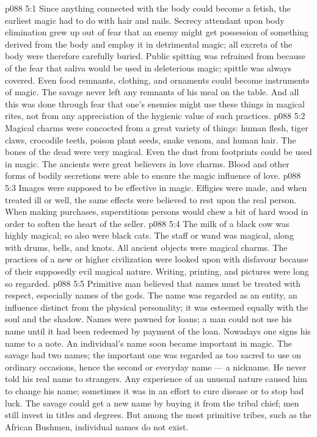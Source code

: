 \vs p088 5:1 Since anything connected with the body could become a fetish, the earliest magic had to do with hair and nails. Secrecy attendant upon body elimination grew up out of fear that an enemy might get possession of something derived from the body and employ it in detrimental magic; all excreta of the body were therefore carefully buried. Public spitting was refrained from because of the fear that saliva would be used in deleterious magic; spittle was always covered. Even food remnants, clothing, and ornaments could become instruments of magic. The savage never left any remnants of his meal on the table. And all this was done through fear that one’s enemies might use these things in magical rites, not from any appreciation of the hygienic value of such practices.
\vs p088 5:2 Magical charms were concocted from a great variety of things: human flesh, tiger claws, crocodile teeth, poison plant seeds, snake venom, and human hair. The bones of the dead were very magical. Even the dust from footprints could be used in magic. The ancients were great believers in love charms. Blood and other forms of bodily secretions were able to ensure the magic influence of love.
\vs p088 5:3 Images were supposed to be effective in magic. Effigies were made, and when treated ill or well, the same effects were believed to rest upon the real person. When making purchases, superstitious persons would chew a bit of hard wood in order to soften the heart of the seller.
\vs p088 5:4 The milk of a black cow was highly magical; so also were black cats. The staff or wand was magical, along with drums, bells, and knots. All ancient objects were magical charms. The practices of a new or higher civilization were looked upon with disfavour because of their supposedly evil magical nature. Writing, printing, and pictures were long so regarded.
\vs p088 5:5 Primitive man believed that names must be treated with respect, especially names of the gods. The name was regarded as an entity, an influence distinct from the physical personality; it was esteemed equally with the soul and the shadow. Names were pawned for loans; a man could not use his name until it had been redeemed by payment of the loan. Nowadays one signs his name to a note. An individual’s name soon became important in magic. The savage had two names; the important one was regarded as too sacred to use on ordinary occasions, hence the second or everyday name --- a nickname. He never told his real name to strangers. Any experience of an unusual nature caused him to change his name; sometimes it was in an effort to cure disease or to stop bad luck. The savage could get a new name by buying it from the tribal chief; men still invest in titles and degrees. But among the most primitive tribes, such as the African Bushmen, individual names do not exist.
